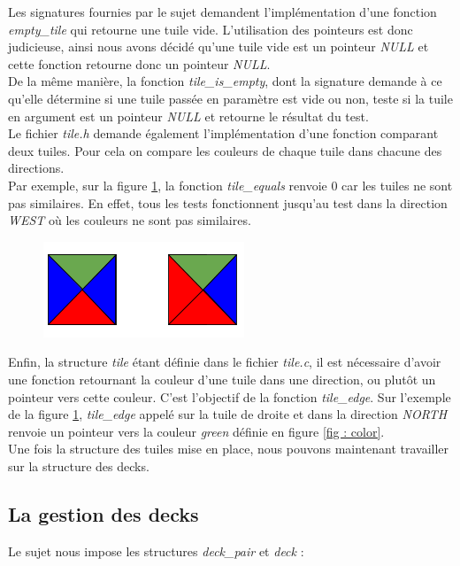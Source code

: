 \documentclass[11pt]{article}
\begin{document}
Les signatures fournies par le sujet demandent l'implémentation d'une fonction \emph{empty\_tile} qui retourne une tuile vide. L'utilisation des pointeurs est donc judicieuse, ainsi nous avons décidé qu'une tuile vide est un pointeur \emph{NULL} et cette fonction retourne donc un pointeur \emph{NULL}. \\

De la même manière, la fonction \emph{tile\_is\_empty}, dont la signature demande à ce qu'elle détermine si une tuile passée en paramètre est vide ou non, teste si la tuile en argument est un pointeur \emph{NULL} et retourne le résultat du test. \\

Le fichier \emph{tile.h} demande également l'implémentation d'une fonction comparant deux tuiles. Pour cela on compare les couleurs de chaque tuile dans chacune des directions. \\
Par exemple, sur la figure \ref{fig : tile_equals}, la fonction \emph{tile\_equals} renvoie 0 car les tuiles ne sont pas similaires. En effet, tous les tests fonctionnent jusqu'au test dans la direction \emph{WEST} où les couleurs ne sont pas similaires.

\begin{figure}[h]
\centering
\includegraphics[scale=0.5]{tile_equals.png}
\label{fig : tile_equals}
\end{figure}

Enfin, la structure \emph{tile} étant définie dans le fichier \emph{tile.c}, il est nécessaire d'avoir une fonction retournant la couleur d'une tuile dans une direction, ou plutôt un pointeur vers cette couleur. C'est l'objectif de la fonction \emph{tile\_edge}. Sur l'exemple de la figure \ref{fig : tile_equals}, \emph{tile\_edge} appelé sur la tuile de droite et dans la direction \emph{NORTH} renvoie un pointeur vers la couleur \emph{green} définie en figure \ref{fig : color}. \\

Une fois la structure des tuiles mise en place, nous pouvons maintenant travailler sur la structure des decks.

\subsection{La gestion des decks}\label{subsec: deck}
Le sujet nous impose les structures \emph{deck\_pair} et \emph{deck} :  \\
\end{document}
